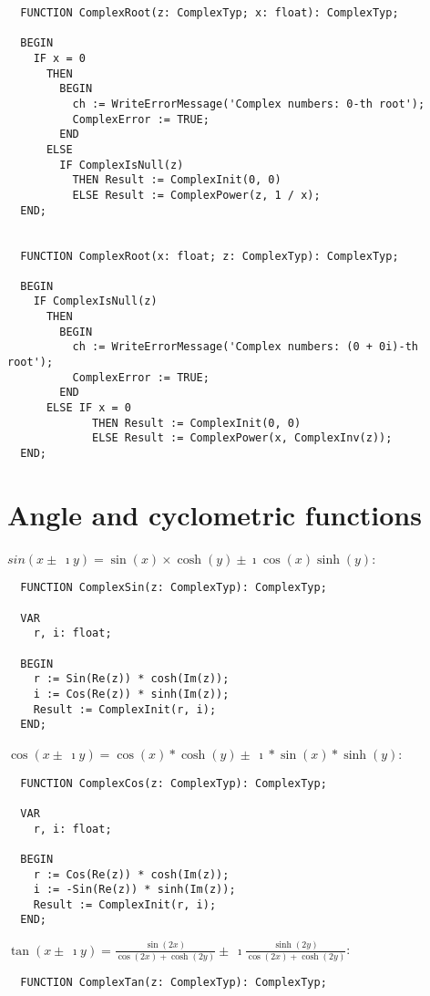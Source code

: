 \begin{refsection}
\begin{lstlisting}
  FUNCTION ComplexRoot(z: ComplexTyp; x: float): ComplexTyp;

  BEGIN
    IF x = 0
      THEN
        BEGIN
          ch := WriteErrorMessage('Complex numbers: 0-th root');
          ComplexError := TRUE;
        END
      ELSE
        IF ComplexIsNull(z)
          THEN Result := ComplexInit(0, 0)
          ELSE Result := ComplexPower(z, 1 / x);
  END;


  FUNCTION ComplexRoot(x: float; z: ComplexTyp): ComplexTyp;

  BEGIN
    IF ComplexIsNull(z)
      THEN
        BEGIN
          ch := WriteErrorMessage('Complex numbers: (0 + 0i)-th root');
          ComplexError := TRUE;
        END
      ELSE IF x = 0
             THEN Result := ComplexInit(0, 0)
             ELSE Result := ComplexPower(x, ComplexInv(z));
  END;
\end{lstlisting}

\section{Angle and cyclometric functions}

 \(sin(x \pm\ \imath y) = \sin(x) \times \cosh(y) \pm \imath \cos(x)  \sinh(y) \):

\begin{lstlisting}
  FUNCTION ComplexSin(z: ComplexTyp): ComplexTyp;

  VAR
    r, i: float;

  BEGIN
    r := Sin(Re(z)) * cosh(Im(z));
    i := Cos(Re(z)) * sinh(Im(z));
    Result := ComplexInit(r, i);
  END;
\end{lstlisting}

\(\cos(x \pm\ \imath y) = \cos(x) * \cosh(y) \pm\ \imath * \sin(x) * \sinh(y) \):

\begin{lstlisting}
  FUNCTION ComplexCos(z: ComplexTyp): ComplexTyp;

  VAR
    r, i: float;

  BEGIN
    r := Cos(Re(z)) * cosh(Im(z));
    i := -Sin(Re(z)) * sinh(Im(z));
    Result := ComplexInit(r, i);
  END;
\end{lstlisting}

\(\tan(x \pm\ \imath y) = \frac{\sin(2x)}{\cos(2x) + \cosh(2y)} \pm\ \imath \frac{\sinh(2y)}{\cos(2x) + \cosh(2y)} \):

\begin{lstlisting}
  FUNCTION ComplexTan(z: ComplexTyp): ComplexTyp;


\end{lstlisting}
\end{refsection}
